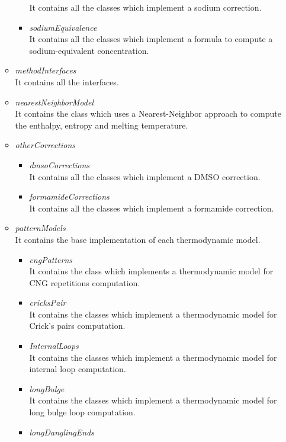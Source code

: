 \documentclass{article}
\begin{document}
\begin{itemize}
\begin{itemize}
\begin{itemize}
      It contains all the classes which implement a sodium correction.
      \item \textit{sodiumEquivalence} \\
      It contains all the classes which implement a formula to compute a sodium-equivalent concentration.
      \end{itemize}
    \item \textit{methodInterfaces} \\
    It contains all the interfaces.
    \item \textit{nearestNeighborModel} \\
    It contains the class which uses a Nearest-Neighbor approach to compute the enthalpy, entropy and
    melting temperature. 
    \item \textit{otherCorrections} \\
      \begin{itemize}
      \item \textit{dmsoCorrections} \\
      It contains all the classes which implement a DMSO correction.
      \item \textit{formamideCorrections} \\
      It contains all the classes which implement a formamide correction.
      \end{itemize}
    \item \textit{patternModels} \\
    It contains the base implementation of each thermodynamic model. 
      \begin{itemize}
      \item \textit{cngPatterns} \\
      It contains the class which implements a thermodynamic model for CNG repetitions computation.
      \item \textit{cricksPair} \\
      It contains the classes which implement a thermodynamic model for Crick's pairs computation.
      \item \textit{InternalLoops} \\
      It contains the classes which implement a thermodynamic model for internal loop computation.
      \item \textit{longBulge} \\
      It contains the classes which implement a thermodynamic model for long bulge loop computation.
      \item \textit{longDanglingEnds} \\

\end{itemize}
\end{itemize}
\end{itemize}
\end{document}
